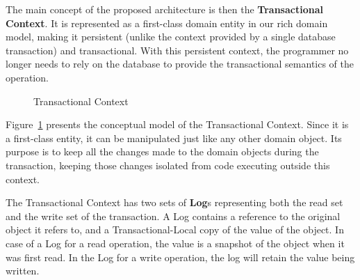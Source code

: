 \documentclass{llncs}
\begin{document}
The main concept of the proposed architecture is then the {\bf
  Transactional Context}. It is represented as a first-class domain
entity in our rich domain model, making it persistent (unlike the
context provided by a single database transaction) and
transactional. With this persistent context, the programmer no longer
needs to rely on the database to provide the transactional semantics
of the operation.

\begin{figure}
  \centering

  \caption{Transactional Context}
  \label{fig:transactionalContext}

\end{figure}

Figure~\ref{fig:transactionalContext} presents the conceptual model of
the Transactional Context. Since it is a first-class entity, it can be
manipulated just like any other domain object. Its purpose is to keep
all the changes made to the domain objects during the transaction,
keeping those changes isolated from code executing outside this
context.

The Transactional Context has two sets of {\bf Log}s representing both
the read set and the write set of the transaction. A Log contains a
reference to the original object it refers to, and a
Transactional-Local copy of the value of the object. In case of a Log
for a read operation, the value is a snapshot of the object when it
was first read. In the Log for a write operation, the log will retain
the value being written.
\end{document}
